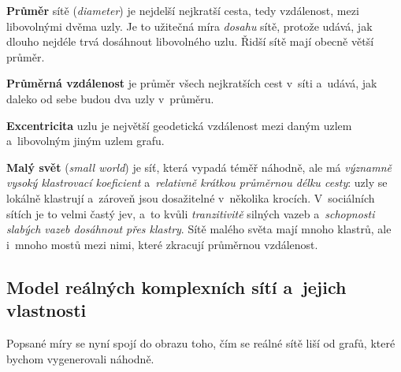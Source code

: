 \documentclass[11pt,a4paper]{article}
\theoremstyle{definition}
\begin{document}
\begin{defbox}
\textbf{Průměr} sítě (\emph{diameter}) je nejdelší nejkratší cesta, tedy vzdálenost, mezi
libovolnými dvěma uzly. Je to užitečná míra \emph{dosahu} sítě, protože udává, jak dlouho
nejdéle trvá dosáhnout libovolného uzlu. Řidší sítě mají obecně větší průměr.

\textbf{Průměrná vzdálenost} je průměr všech nejkratších cest v~síti a~udává, jak daleko od
sebe budou dva uzly v~průměru.

\textbf{Excentricita} uzlu je největší geodetická vzdálenost mezi daným uzlem
a~libovolným jiným uzlem grafu.

\textbf{Malý svět} (\emph{small world}) je síť, která vypadá téměř náhodně, ale má
\emph{významně vysoký klastrovací koeficient} a~\emph{relativně krátkou průměrnou délku
cesty}: uzly se lokálně klastrují a~zároveň jsou dosažitelné v~několika krocích.
V~sociálních sítích je to velmi častý jev, a~to kvůli \emph{tranzitivitě} silných vazeb
a~\emph{schopnosti slabých vazeb dosáhnout přes klastry}. Sítě malého světa mají mnoho
klastrů, ale i~mnoho mostů mezi nimi, které zkracují průměrnou vzdálenost.
\end{defbox}

\subsection{Model reálných komplexních sítí a~jejich vlastnosti}

Popsané míry se nyní spojí do obrazu toho, čím se reálné sítě liší od grafů, které bychom
vygenerovali náhodně.
\end{document}
